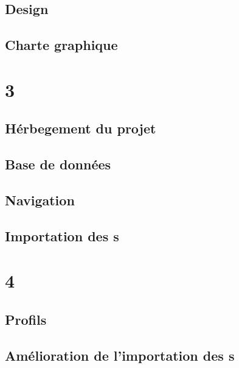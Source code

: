 \documentclass[french]{report}
\begin{document}
\subsection{Design}
\label{partie_design}

\subsection{Charte graphique}
\label{partie_charte_graphique}


\section{3\ieme{} \sprint{}}
\label{sprint3}
\subsection{Hérbegement du projet}
\label{hebergement_du_projet}


\subsection{Base de données}
\label{base_de_donnees}


\subsection{Navigation}
\label{navigation}


\subsection{Importation des \plugin s}
\label{importation_plugin_sprint3}


\section{4\ieme{} \sprint{}}
\label{sprint4}
\subsection{Profils}
\label{profils}


\subsection{Amélioration de l'importation des \plugin s}
\label{importation_plugin_sprint4}

\end{document}
